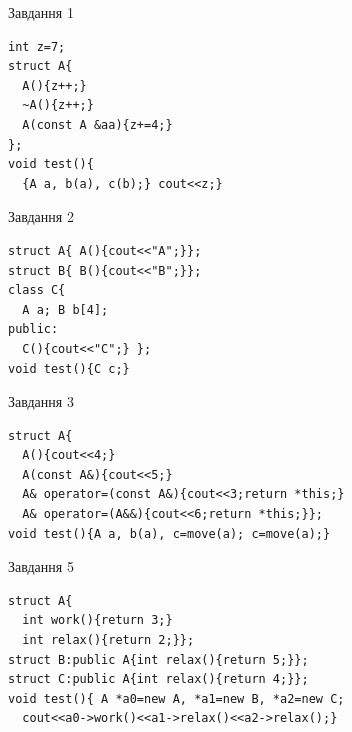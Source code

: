 \documentclass[12pt, ukrainian]{article}
\begin{document}
{{{{{{{{{{{{{\begin{minipage}[t]{11cm}
{\begin{center}Завдання {1}\end{center}}
\vspace{-6mm}

\begin{verbatim}
int z=7;
struct A{
  A(){z++;}
  ~A(){z++;}
  A(const A &aa){z+=4;}
};
void test(){
  {A a, b(a), c(b);} cout<<z;}
\end{verbatim}            


               
{\begin{center}Завдання {2}\end{center}}
\vspace{-6mm}

\begin{verbatim}
struct A{ A(){cout<<"A";}};
struct B{ B(){cout<<"B";}};
class C{
  A a; B b[4];
public:
  C(){cout<<"C";} };
void test(){C c;}
\end{verbatim}            


               
{\begin{center}Завдання {3}\end{center}}
\vspace{-6mm}

\begin{verbatim}
struct A{
  A(){cout<<4;}
  A(const A&){cout<<5;}
  A& operator=(const A&){cout<<3;return *this;}
  A& operator=(A&&){cout<<6;return *this;}};
void test(){A a, b(a), c=move(a); c=move(a);}
\end{verbatim}            


               
{\begin{center}Завдання {5}\end{center}}
\vspace{-6mm}

\begin{verbatim}
struct A{
  int work(){return 3;}
  int relax(){return 2;}};
struct B:public A{int relax(){return 5;}};
struct C:public A{int relax(){return 4;}};
void test(){ A *a0=new A, *a1=new B, *a2=new C;
  cout<<a0->work()<<a1->relax()<<a2->relax();}
\end{verbatim}            


\end{minipage}
\vline \hspace{8mm}
\begin{minipage}[t]{7cm}
               

\end{minipage}}}}}}}}}}}}}}
\end{document}
